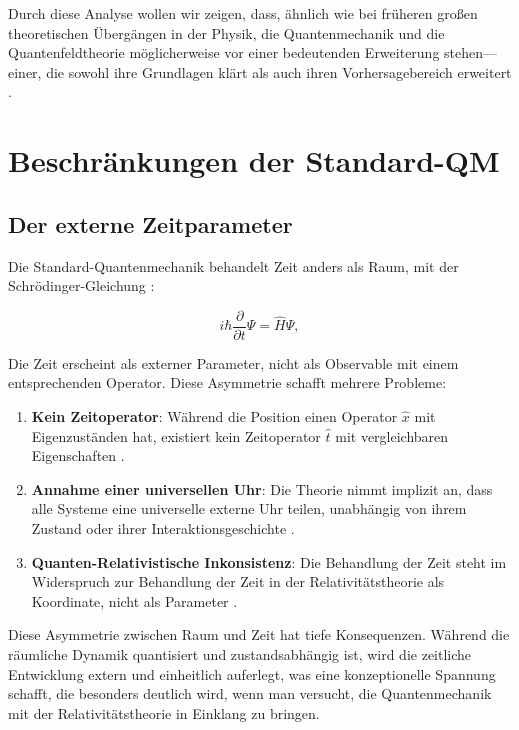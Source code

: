 \documentclass[12pt,a4paper]{article}
\begin{document}
	Durch diese Analyse wollen wir zeigen, dass, ähnlich wie bei früheren großen theoretischen Übergängen in der Physik, die Quantenmechanik und die Quantenfeldtheorie möglicherweise vor einer bedeutenden Erweiterung stehen—einer, die sowohl ihre Grundlagen klärt als auch ihren Vorhersagebereich erweitert \cite{pascher_higgs_2025, pascher_photons_2025}.
	
	\section{Beschränkungen der Standard-QM}
	\label{sec:limitations}
	
	\subsection{Der externe Zeitparameter}
	\label{subsec:time_parameter}
	
	Die Standard-Quantenmechanik behandelt Zeit anders als Raum, mit der Schrödinger-Gleichung \cite{Schrodinger1926}:
	
	\begin{equation}
		i\hbar \frac{\partial}{\partial t} \Psi = \hat{H} \Psi,
		\label{eq:schrodinger}
	\end{equation}
	
	Die Zeit erscheint als externer Parameter, nicht als Observable mit einem entsprechenden Operator. Diese Asymmetrie schafft mehrere Probleme:
	
	\begin{enumerate}
		\item \textbf{Kein Zeitoperator}: Während die Position einen Operator $\hat{x}$ mit Eigenzuständen hat, existiert kein Zeitoperator $\hat{t}$ mit vergleichbaren Eigenschaften \cite{Pauli1980}.
		
		\item \textbf{Annahme einer universellen Uhr}: Die Theorie nimmt implizit an, dass alle Systeme eine universelle externe Uhr teilen, unabhängig von ihrem Zustand oder ihrer Interaktionsgeschichte \cite{Page1983}.
		
		\item \textbf{Quanten-Relativistische Inkonsistenz}: Die Behandlung der Zeit steht im Widerspruch zur Behandlung der Zeit in der Relativitätstheorie als Koordinate, nicht als Parameter \cite{Busch1994, Peres1980}.
	\end{enumerate}
	
	Diese Asymmetrie zwischen Raum und Zeit hat tiefe Konsequenzen. Während die räumliche Dynamik quantisiert und zustandsabhängig ist, wird die zeitliche Entwicklung extern und einheitlich auferlegt, was eine konzeptionelle Spannung schafft, die besonders deutlich wird, wenn man versucht, die Quantenmechanik mit der Relativitätstheorie in Einklang zu bringen.
	
\end{document}
